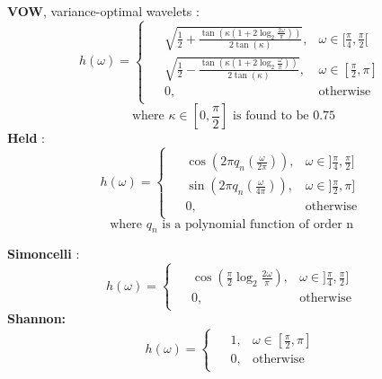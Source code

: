 \noindent\textbf{VOW}, variance-optimal wavelets \cite{pad_vow:_2014} :
\begin{equation*}
\label{VOW}
  h(\omega) =
    \begin{cases}
    \begin{aligned}
      &\sqrt{\frac{1}{2} + \frac{\tan(\kappa(1+2\log_2\frac{2\omega}{\pi}))}{2\tan(\kappa)}} , &\omega \in [\frac{\pi}{4} , \frac{\pi}{2} [ \\
      &\sqrt{\frac{1}{2} - \frac{\tan(\kappa(1+2\log_2\frac{\omega}{\pi}))}{2\tan(\kappa)}} , &\omega \in [\frac{\pi}{2} , \pi ] \\
      &0, &\text{otherwise}
    \end{aligned}
    \end{cases}
\end{equation*}
\begin{equation*}
  \text{where } \kappa \in [0, \frac{\pi}{2}] \text{ is found to be } 0.75
\end{equation*}
\newline
\noindent\textbf{Held} \cite{held_steerable_2010} :
\begin{equation*}
\label{Held}
  h(\omega) =
    \begin{cases}
    \begin{aligned}
&\cos\left(2\pi q_n(\frac{\omega}{2\pi})\right) , &\omega \in ]\frac{\pi}{4} , \frac{\pi}{2} ] \\
  &\sin\left(2\pi q_n(\frac{\omega}{4\pi})\right) , &\omega \in ]\frac{\pi}{2} , \pi ] \\
      &0, &\text{otherwise}
    \end{aligned}
    \end{cases}
\end{equation*}
\begin{equation*}
  \text{where } q_n \text{ is a polynomial function of order n } %
\end{equation*}

\noindent\textbf{Simoncelli} \cite{portilla_image_2000, simoncelli_steerable_1995} :
\begin{equation*}
\label{Simoncelli}
  h(\omega) =
    \begin{cases}
    \begin{aligned}
  &\cos\left(\frac{\pi}{2} \log_2\frac{2\omega}{\pi}\right) , &\omega \in ]\frac{\pi}{4} , \frac{\pi}{2} ] \\
  &0, &\text{otherwise}
    \end{aligned}
    \end{cases}
\end{equation*}
\noindent\textbf{Shannon:}
\begin{equation*}
\label{Shannon}
  h(\omega) =
    \begin{cases}
    \begin{aligned}
  &1, &\omega \in [\frac{\pi}{2} , \pi ] \\
  &0, &\text{otherwise}
    \end{aligned}
    \end{cases}
\end{equation*}

